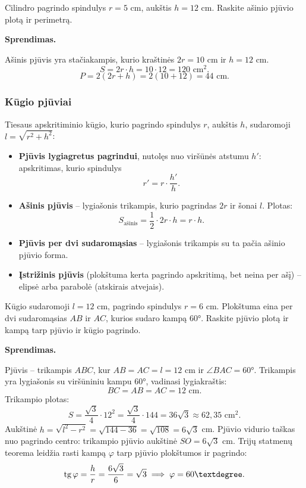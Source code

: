 \begin{example}
Cilindro pagrindo spindulys $r = 5$ cm, aukštis $h = 12$ cm. Raskite ašinio pjūvio plotą ir perimetrą.

\textbf{Sprendimas.}

Ašinis pjūvis yra stačiakampis, kurio kraštinės $2r = 10$ cm ir $h = 12$ cm.
\[
S = 2r \cdot h = 10 \cdot 12 = 120 \text{ cm}^2.
\]
\[
P = 2(2r + h) = 2(10 + 12) = 44 \text{ cm}.
\]
\end{example}

\subsubsection{Kūgio pjūviai}

Tiesaus apskritiminio kūgio, kurio pagrindo spindulys $r$, aukštis $h$, sudaromoji $l = \sqrt{r^2 + h^2}$:

\begin{itemize}
    \item \textbf{Pjūvis lygiagretus pagrindui}, nutolęs nuo viršūnės atstumu $h'$: apskritimas, kurio spindulys
    \[
    r' = r \cdot \frac{h'}{h}.
    \]
    \item \textbf{Ašinis pjūvis} – lygiašonis trikampis, kurio pagrindas $2r$ ir šonai $l$. Plotas:
    \[
    S_{\text{ašinis}} = \frac{1}{2} \cdot 2r \cdot h = r \cdot h.
    \]
    \item \textbf{Pjūvis per dvi sudaromąsias} – lygiašonis trikampis su ta pačia ašinio pjūvio forma.
    \item \textbf{Įstrižinis pjūvis} (plokštuma kerta pagrindo apskritimą, bet neina per ašį) – elipsė arba parabolė (atskirais atvejais).
\end{itemize}

\begin{example}
Kūgio sudaromoji $l = 12$ cm, pagrindo spindulys $r = 6$ cm. Plokštuma eina per dvi sudaromąsias $AB$ ir $AC$, kurios sudaro kampą $60°$. Raskite pjūvio plotą ir kampą tarp pjūvio ir kūgio pagrindo.

\textbf{Sprendimas.}

Pjūvis – trikampis $ABC$, kur $AB = AC = l = 12$ cm ir $\angle BAC = 60°$. Trikampis yra lygiašonis su viršūniniu kampu $60°$, vadinasi lygiakraštis:
\[
BC = AB = AC = 12 \text{ cm}.
\]
Trikampio plotas:
\[
S = \frac{\sqrt{3}}{4} \cdot 12^2 = \frac{\sqrt{3}}{4} \cdot 144 = 36\sqrt{3} \approx 62{,}35 \text{ cm}^2.
\]
Aukštinė $h = \sqrt{l^2 - r^2} = \sqrt{144 - 36} = \sqrt{108} = 6\sqrt{3}$ cm.
Pjūvio vidurio taškas nuo pagrindo centro: trikampio pjūvio aukštinė $SO = 6\sqrt{3}$ cm. Trijų statmenų teorema leidžia rasti kampą $\varphi$ tarp pjūvio plokštumos ir pagrindo:
\[
\tg\varphi = \frac{h}{r} = \frac{6\sqrt{3}}{6} = \sqrt{3} \implies \varphi = 60°.
\]
\end{example}


